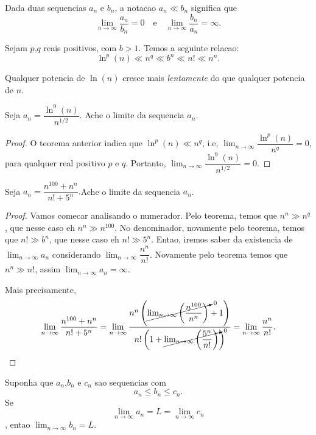       \begin{definition}
         Dada duas sequencias ${a_{n}}$ e ${b_{n}}$, a notacao $a_{n} \ll b_{n}$ significa que
         $$\lim_{n\to\infty}\dfrac{a_{n}}{b_{n}} = 0\quad\textrm{e}\quad \lim_{n\to\infty}\dfrac{b_{n}}{a_{n}} = \infty.$$
      \end{definition}
      \begin{theorem}
         Sejam $p$,$q$ reais positivos, com $b>1$. Temos a seguinte relacao:
         $$\ln^{p}(n) \ll n^{q} \ll b^{n} \ll n! \ll n^{n}.$$
      \end{theorem}
      Qualquer potencia de $\ln(n)$ cresce mais \emph{lentamente} do que qualquer potencia de $n$.
      \begin{exmp}
         Seja $a_{n} = \dfrac{\ln^{9}(n)}{n^{1/2}}$. Ache o limite da sequencia $a_{n}$.
         \begin{proof}
            O teorema anterior indica que $\ln^{p}(n) \ll n^{q}$, i.e, $\lim_{n\to\infty}\dfrac{\ln^{p}(n)}{n^{q}} = 0$, para qualquer real positivo $p$ e $q$. Portanto, $\lim_{n\to\infty}\dfrac{\ln^{9}(n)}{n^{1/2}} = 0.$
         \end{proof}
      \end{exmp}
      \begin{exmp}
         Seja $a_{n} = \dfrac{n^{100}+n^{n}}{n!+5^{n}}.$Ache o limite da sequencia $a_{n}$.
         \begin{proof}
            Vamos comecar analisando o numerador. Pelo teorema, temos que $n^{n} \gg n^{q}$, que nesse caso eh $n^{n} \gg n^{100}$. No denominador, novamente pelo teorema, temos que $n! \gg b^{n}$, que nesse caso eh $n! \gg 5^{n}$. Entao, iremos saber da existencia de $\lim_{n\to\infty}a_{n}$ considerando $\lim_{n\to\infty} \dfrac{n^{n}}{n!}.$
            Novamente pelo teorema temos que $n^{n} \gg n!$, assim $\lim_{n\to\infty} a_{n} = \infty.$
            
            Mais precisamente, 
            $$\lim_{n\to\infty}\dfrac{n^{100}+n^{n}}{n!+5^{n}} = \lim_{n\to\infty}\dfrac{n^{n}\left(\cancelto{0}{\lim_{n\to\infty}\left(\dfrac{n^{100}}{n^{n}}\right)}+1\right)}{n!\left(1+\cancelto{0}{\lim_{n\to\infty}\left(\dfrac{5^{n}}{n!}\right)}\right)} = \lim_{n\to\infty} \dfrac{n^{n}}{n!}.$$
         \end{proof}
      \end{exmp}
      \begin{theorem}
         Suponha que $a_{n}$,$b_{n}$ e $c_{n}$ sao sequencias com $$a_{n} \leq b_{n} \leq c_{n}.$$ Se $$\lim_{n\to\infty}a_{n} = L = \lim_{n\to\infty}c_{n}$$, entao $\lim_{n\to\infty}b_{n} = L.$
      \end{theorem}
